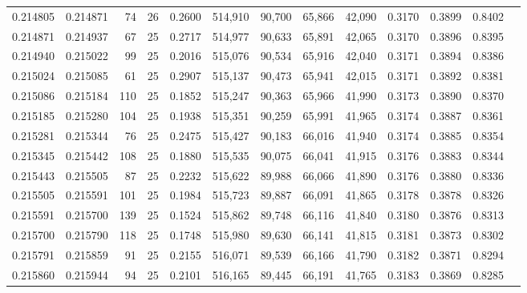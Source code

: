 \begin{tabular}{rrrrrrrrrrrrr}
0.214805 & 0.214871 &    74 &  26 &                                     0.2600 & 514,910 &  90,700 &  65,866 &  42,090 & 0.3170 & 0.3899 & 0.8402 \\
0.214871 & 0.214937 &    67 &  25 &                                     0.2717 & 514,977 &  90,633 &  65,891 &  42,065 & 0.3170 & 0.3896 & 0.8395 \\
0.214940 & 0.215022 &    99 &  25 &                                     0.2016 & 515,076 &  90,534 &  65,916 &  42,040 & 0.3171 & 0.3894 & 0.8386 \\
0.215024 & 0.215085 &    61 &  25 &                                     0.2907 & 515,137 &  90,473 &  65,941 &  42,015 & 0.3171 & 0.3892 & 0.8381 \\
0.215086 & 0.215184 &   110 &  25 &                                     0.1852 & 515,247 &  90,363 &  65,966 &  41,990 & 0.3173 & 0.3890 & 0.8370 \\
0.215185 & 0.215280 &   104 &  25 &                                     0.1938 & 515,351 &  90,259 &  65,991 &  41,965 & 0.3174 & 0.3887 & 0.8361 \\
0.215281 & 0.215344 &    76 &  25 &                                     0.2475 & 515,427 &  90,183 &  66,016 &  41,940 & 0.3174 & 0.3885 & 0.8354 \\
0.215345 & 0.215442 &   108 &  25 &                                     0.1880 & 515,535 &  90,075 &  66,041 &  41,915 & 0.3176 & 0.3883 & 0.8344 \\
0.215443 & 0.215505 &    87 &  25 &                                     0.2232 & 515,622 &  89,988 &  66,066 &  41,890 & 0.3176 & 0.3880 & 0.8336 \\
0.215505 & 0.215591 &   101 &  25 &                                     0.1984 & 515,723 &  89,887 &  66,091 &  41,865 & 0.3178 & 0.3878 & 0.8326 \\
0.215591 & 0.215700 &   139 &  25 &                                     0.1524 & 515,862 &  89,748 &  66,116 &  41,840 & 0.3180 & 0.3876 & 0.8313 \\
0.215700 & 0.215790 &   118 &  25 &                                     0.1748 & 515,980 &  89,630 &  66,141 &  41,815 & 0.3181 & 0.3873 & 0.8302 \\
0.215791 & 0.215859 &    91 &  25 &                                     0.2155 & 516,071 &  89,539 &  66,166 &  41,790 & 0.3182 & 0.3871 & 0.8294 \\
0.215860 & 0.215944 &    94 &  25 &                                     0.2101 & 516,165 &  89,445 &  66,191 &  41,765 & 0.3183 & 0.3869 & 0.8285 \\

\end{tabular}
